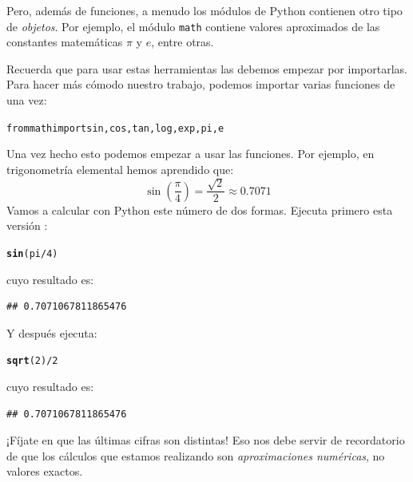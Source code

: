 \documentclass[10pt,a4paper]{article}\usepackage[]{graphicx}\usepackage[]{color}
\makeatletter
\newcommand{\hlnum}[1]{\textcolor[rgb]{0.686,0.059,0.569}{#1}}%
\newcommand{\hlopt}[1]{\textcolor[rgb]{0,0,0}{#1}}%
\newcommand{\hlstd}[1]{\textcolor[rgb]{0.345,0.345,0.345}{#1}}%
\newcommand{\hlkwd}[1]{\textcolor[rgb]{0.737,0.353,0.396}{\textbf{#1}}}%
\newenvironment{kframe}{%
 \def\at@end@of@kframe{}%
 \ifinner\ifhmode%
  \def\at@end@of@kframe{\end{minipage}}%
  \begin{minipage}{\columnwidth}%
 \fi\fi%
 \def\FrameCommand##1{\hskip\@totalleftmargin \hskip-\fboxsep
 \colorbox{shadecolor}{##1}\hskip-\fboxsep
     \hskip-\linewidth \hskip-\@totalleftmargin \hskip\columnwidth}%
 \MakeFramed {\advance\hsize-\width
   \@totalleftmargin\z@ \linewidth\hsize
   \@setminipage}}%
 {\par\unskip\endMakeFramed%
 \at@end@of@kframe}
\newenvironment{knitrout}{}{} %
\newcounter {cont01}
\makeatother
\begin{document}
Pero, además de funciones, a menudo los módulos de Python contienen otro tipo de {\em objetos}. Por ejemplo, el módulo {\tt math} contiene valores aproximados de las constantes matemáticas $\pi$ y $e$, entre otras.

Recuerda que para usar estas herramientas las debemos empezar por importarlas. Para hacer más cómodo nuestro trabajo, podemos importar varias funciones de una vez:
\begin{knitrout}
\color{fgcolor}\begin{kframe}
\begin{alltt}
from math import sin, cos, tan, log, exp, pi, e
\end{alltt}
\end{kframe}
\end{knitrout}
Una vez hecho esto podemos empezar a usar las funciones. Por ejemplo, en trigonometría elemental hemos aprendido que:
$$\sin\left(\dfrac{\pi}{4}\right) = \dfrac{\sqrt{2}}{2}\approx 0.7071$$
Vamos a calcular con Python este número de dos formas. Ejecuta primero esta versión :
\begin{knitrout}
\color{fgcolor}\begin{kframe}
\begin{alltt}
\hlkwd{sin}\hlstd{(pi}\hlopt{/}\hlnum{4}\hlstd{)}
\end{alltt}
\end{kframe}
\end{knitrout}
cuyo resultado es:
\begin{knitrout}
\color{fgcolor}\begin{kframe}
\begin{verbatim}
## 0.7071067811865476
\end{verbatim}
\end{kframe}
\end{knitrout}
Y después ejecuta:
\begin{knitrout}
\color{fgcolor}\begin{kframe}
\begin{alltt}
\hlkwd{sqrt}\hlstd{(}\hlnum{2}\hlstd{)}\hlopt{/}\hlnum{2}
\end{alltt}
\end{kframe}
\end{knitrout}
cuyo resultado es:
\begin{knitrout}
\color{fgcolor}\begin{kframe}
\begin{verbatim}
## 0.7071067811865476
\end{verbatim}
\end{kframe}
\end{knitrout}
¡Fíjate en que las últimas cifras son distintas! Eso nos debe servir de recordatorio de que los cálculos que estamos realizando son {\em aproximaciones numéricas}, no valores exactos.
\end{document}
